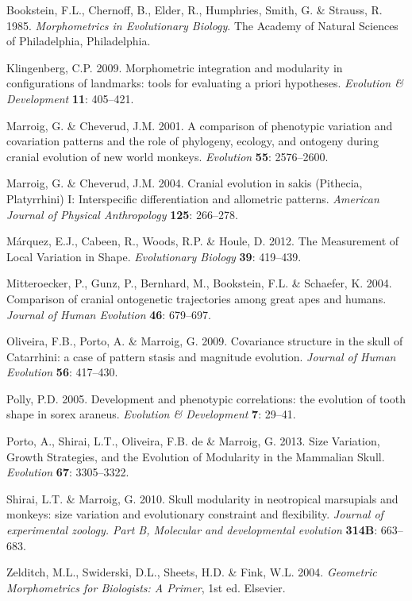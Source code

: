 \documentclass[11pt,]{article}
\begin{document}
Bookstein, F.L., Chernoff, B., Elder, R., Humphries, Smith, G. \&
Strauss, R. 1985. \emph{Morphometrics in Evolutionary Biology}. The
Academy of Natural Sciences of Philadelphia, Philadelphia.

Klingenberg, C.P. 2009. Morphometric integration and modularity in
configurations of landmarks: tools for evaluating a priori hypotheses.
\emph{Evolution \& Development} \textbf{11}: 405--421.

Marroig, G. \& Cheverud, J.M. 2001. A comparison of phenotypic variation
and covariation patterns and the role of phylogeny, ecology, and
ontogeny during cranial evolution of new world monkeys. \emph{Evolution}
\textbf{55}: 2576--2600.

Marroig, G. \& Cheverud, J.M. 2004. Cranial evolution in sakis
(Pithecia, Platyrrhini) I: Interspecific differentiation and allometric
patterns. \emph{American Journal of Physical Anthropology} \textbf{125}:
266--278.

Márquez, E.J., Cabeen, R., Woods, R.P. \& Houle, D. 2012. The
Measurement of Local Variation in Shape. \emph{Evolutionary Biology}
\textbf{39}: 419--439.

Mitteroecker, P., Gunz, P., Bernhard, M., Bookstein, F.L. \& Schaefer,
K. 2004. Comparison of cranial ontogenetic trajectories among great apes
and humans. \emph{Journal of Human Evolution} \textbf{46}: 679--697.

Oliveira, F.B., Porto, A. \& Marroig, G. 2009. Covariance structure in
the skull of Catarrhini: a case of pattern stasis and magnitude
evolution. \emph{Journal of Human Evolution} \textbf{56}: 417--430.

Polly, P.D. 2005. Development and phenotypic correlations: the evolution
of tooth shape in sorex araneus. \emph{Evolution \& Development}
\textbf{7}: 29--41.

Porto, A., Shirai, L.T., Oliveira, F.B. de \& Marroig, G. 2013. Size
Variation, Growth Strategies, and the Evolution of Modularity in the
Mammalian Skull. \emph{Evolution} \textbf{67}: 3305--3322.

Shirai, L.T. \& Marroig, G. 2010. Skull modularity in neotropical
marsupials and monkeys: size variation and evolutionary constraint and
flexibility. \emph{Journal of experimental zoology. Part B, Molecular
and developmental evolution} \textbf{314B}: 663--683.

Zelditch, M.L., Swiderski, D.L., Sheets, H.D. \& Fink, W.L. 2004.
\emph{Geometric Morphometrics for Biologists: A Primer}, 1st ed.
Elsevier.
\end{document}
